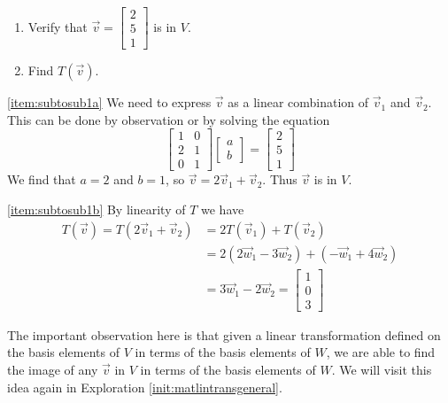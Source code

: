 \documentclass{ximera}
\begin{document}
\begin{example}
\begin{enumerate}
\item \label{item:subtosub1a}
Verify that $\vec{v}=\begin{bmatrix}2\\5\\1\end{bmatrix}$ is in $V$.
\item\label{item:subtosub1b}
Find $T(\vec{v})$.
\end{enumerate}
\begin{explanation}
\ref{item:subtosub1a} We need to express $\vec{v}$ as a linear combination of $\vec{v}_1$ and $\vec{v}_2$.  This can be done by observation or by solving the equation
$$\begin{bmatrix}1&0\\2&1\\0&1\end{bmatrix}\begin{bmatrix}a\\b\end{bmatrix}=\begin{bmatrix}2\\5\\1\end{bmatrix}$$
We find that $a=2$ and $b=1$, so $\vec{v}=2\vec{v}_1+\vec{v}_2$.  Thus $\vec{v}$ is in $V$.

\ref{item:subtosub1b} By linearity of $T$ we have \begin{align*}T(\vec{v})=T(2\vec{v}_1+\vec{v}_2)&=2T(\vec{v}_1)+T(\vec{v}_2)\\&=2(2\vec{w}_1-3\vec{w}_2)+(-\vec{w}_1+4\vec{w}_2)\\&=3\vec{w}_1-2\vec{w}_2=\begin{bmatrix}1\\0\\3\end{bmatrix}
\end{align*}

The important observation here is that given a linear transformation defined on the basis elements of $V$ in terms of the basis elements of $W$, we are able to find the image of any $\vec{v}$ in $V$ in terms of the basis elements of $W$. We will visit this idea again in Exploration \ref{init:matlintransgeneral}.

\end{explanation}

\end{example}
\end{document}
